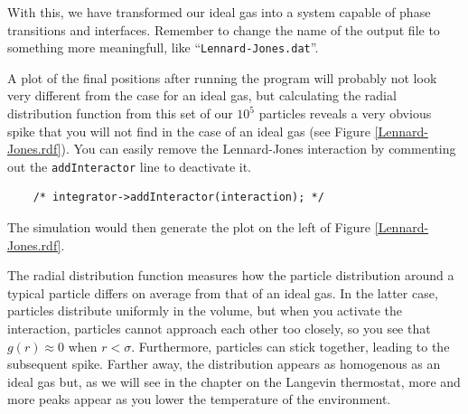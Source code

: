 With this, we have transformed our ideal gas into a system capable of phase
transitions and interfaces. Remember to change the name of the output file to
something more meaningfull, like ``\texttt{Lennard-Jones.dat}''.

A plot of the final positions after running the program will probably not look
very different from the case for an ideal gas, but calculating the radial
distribution function from this set of our $10^5$ particles reveals a very
obvious spike that you will not find in the case of an ideal gas (see Figure
\ref{Lennard-Jones.rdf}). You can easily remove the Lennard-Jones interaction by
commenting out the \texttt{addInteractor} line to deactivate it.
\begin{lstlisting}
    /* integrator->addInteractor(interaction); */
\end{lstlisting}
The simulation would then generate the plot on the left of Figure
\ref{Lennard-Jones.rdf}.

The radial distribution function measures how the particle distribution around a
typical particle differs on average from that of an ideal gas. In the latter
case, particles distribute uniformly in the volume, but when you activate the
interaction, particles cannot approach each other too closely, so you see that
$g(r) \approx 0$ when $r < \sigma$. Furthermore, particles can stick together,
leading to the subsequent spike. Farther away, the distribution appears as
homogenous as an ideal gas but, as we will see in the chapter on the Langevin
thermostat, more and more peaks appear as you lower the temperature of the
environment.

